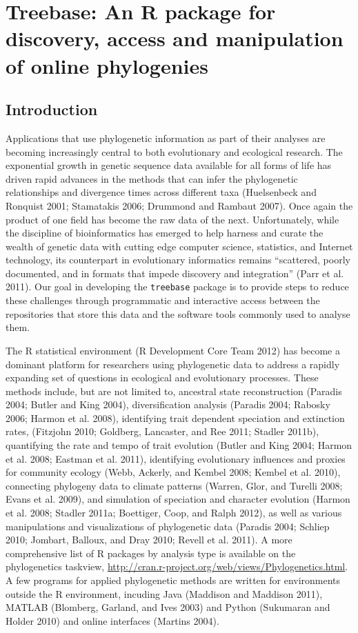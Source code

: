 
\chapter{Treebase: An R package for discovery, access and manipulation of online phylogenies}
\section{Introduction}

Applications that use phylogenetic information as part of their analyses
are becoming increasingly central to both evolutionary and ecological
research. The exponential growth in genetic sequence data available for
all forms of life has driven rapid advances in the methods that can
infer the phylogenetic relationships and divergence times across
different taxa (Huelsenbeck and Ronquist 2001; Stamatakis 2006; Drummond
and Rambaut 2007). Once again the product of one field has become the
raw data of the next. Unfortunately, while the discipline of
bioinformatics has emerged to help harness and curate the wealth of
genetic data with cutting edge computer science, statistics, and
Internet technology, its counterpart in evolutionary informatics remains
``scattered, poorly documented, and in formats that impede discovery and
integration'' (Parr et al. 2011). Our goal in developing the
\texttt{treebase} package is to provide steps to reduce these challenges
through programmatic and interactive access between the repositories
that store this data and the software tools commonly used to analyse
them.

The R statistical environment (R Development Core Team 2012) has become
a dominant platform for researchers using phylogenetic data to address a
rapidly expanding set of questions in ecological and evolutionary
processes. These methods include, but are not limited to, ancestral
state reconstruction (Paradis 2004; Butler and King 2004),
diversification analysis (Paradis 2004; Rabosky 2006; Harmon et al.
2008), identifying trait dependent speciation and extinction rates,
(Fitzjohn 2010; Goldberg, Lancaster, and Ree 2011; Stadler 2011b),
quantifying the rate and tempo of trait evolution (Butler and King 2004;
Harmon et al. 2008; Eastman et al. 2011), identifying evolutionary
influences and proxies for community ecology (Webb, Ackerly, and Kembel
2008; Kembel et al. 2010), connecting phylogeny data to climate patterns
(Warren, Glor, and Turelli 2008; Evans et al. 2009), and simulation of
speciation and character evolution (Harmon et al. 2008; Stadler 2011a;
Boettiger, Coop, and Ralph 2012), as well as various manipulations and
visualizations of phylogenetic data (Paradis 2004; Schliep 2010;
Jombart, Balloux, and Dray 2010; Revell et al. 2011). A more
comprehensive list of R packages by analysis type is available on the
phylogenetics taskview,
\href{http://cran.r-project.org/web/views/Phylogenetics.html}{http://cran.r-project.org/web/views/Phylogenetics.html}.
A few programs for applied phylogenetic methods are written for
environments outside the R environment, incuding Java (Maddison and
Maddison 2011), MATLAB (Blomberg, Garland, and Ives 2003) and Python
(Sukumaran and Holder 2010) and online interfaces (Martins 2004).

